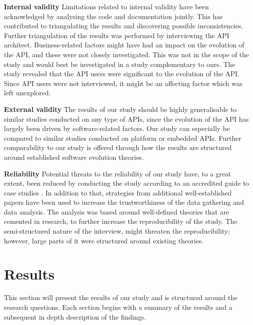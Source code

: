 \documentclass{sig-alternate}
\begin{document}
\smallskip \noindent
\textbf{Internal validity  } Limitations related to internal validity have been acknowledged by analysing the code and documentation jointly. This has contributed to triangulating the results and discovering possible inconsistencies. Further triangulation of the results was performed by interviewing the API architect. Business-related factors might have had an impact on the evolution of the API, and these were not closely investigated. This was not in the scope of the study and would best be investigated in a study complementary to ours. The study revealed that the API users were significant to the evolution of the API. Since API users were not interviewed, it might be an affecting factor which was left unexplored. 

\smallskip \noindent
\textbf{External validity  } The results of our study should be highly generalisable to similar studies conducted on any type of APIs, since the evolution of the API has largely been driven by software-related factors. Our study can especially be compared to similar studies conducted on platform or embedded APIs. Further comparability to our study is offered through how the results are structured around established software evolution theories. 

\smallskip \noindent
\textbf{Reliability  } Potential threats to the reliability of our study have, to a great extent, been reduced by conducting the study according to an accredited guide to case studies \cite{runeson2009guidelines}. In addition to that, strategies from additional well-established papers \cite{andersson2007spiral, robson2002real, seaman1999qualitative} have been used to increase the trustworthiness of the data gathering and data analysis. The analysis was based around well-defined theories that are cemented in research, to further increase the reproducibility of the study. The semi-structured nature of the interview, might threaten the reproducibility; however, large parts of it were structured around existing theories. 




\section{Results} \label{results} 

This section will present the results of our study and is structured around the research questions. Each section begins with a summary of the results and a subsequent in depth description of the findings.
\end{document}
